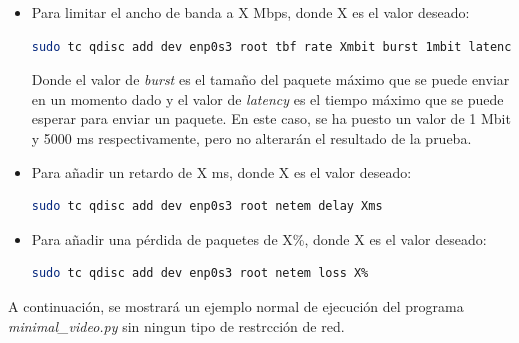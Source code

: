 \begin{itemize}
    \item Para limitar el ancho de banda a X Mbps, donde X es el valor deseado:
    \begin{lstlisting}[language=bash, breaklines=true]
    sudo tc qdisc add dev enp0s3 root tbf rate Xmbit burst 1mbit latency 5000ms
\end{lstlisting}
    Donde el valor de \textit{burst} es el tamaño del paquete máximo que se puede enviar en un momento dado y el valor de \textit{latency} es el tiempo máximo que se puede esperar para enviar un paquete. En este caso, se ha puesto un valor de 1 Mbit y 5000 ms respectivamente, pero no alterarán el resultado de la prueba.
    \item Para añadir un retardo de X ms, donde X es el valor deseado:
    \begin{lstlisting}[language=bash]
    sudo tc qdisc add dev enp0s3 root netem delay Xms
\end{lstlisting}
    \item Para añadir una pérdida de paquetes de X\%, donde X es el valor deseado:
    \begin{lstlisting}[language=bash]
    sudo tc qdisc add dev enp0s3 root netem loss X%
\end{lstlisting}
\end{itemize}

A continuación, se mostrará un ejemplo normal de ejecución del programa \textit{minimal\_video.py} sin ningun tipo de restrcción de red.

